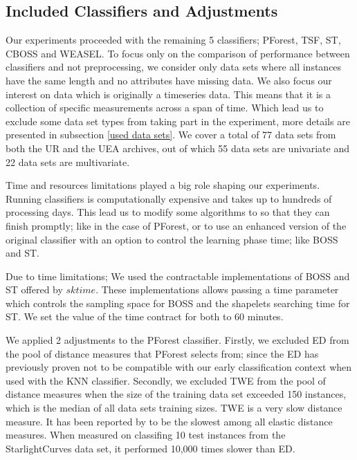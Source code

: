\subsection{Included Classifiers and Adjustments}
\label{SubsectionIncludedClassifiers}
Our experiments proceeded with the remaining 5 classifiers; PForest, TSF, ST, CBOSS and WEASEL.
To focus only on the comparison of performance between classifiers and not preprocessing, we consider only data sets where all instances have the same length and no attributes have missing data.
We also focus our interest on data which is originally a timeseries data. This means that it is a collection of specific measurements across a span of time.
Which lead us to exclude some data set types from taking part in the experiment, more details are presented in subsection \ref{used data sets}.
We cover a total of 77 data sets from both the UR and the UEA archives, out of which 55 data sets are univariate and 22 data sets are multivariate.

Time and resources limitations played a big role shaping our experiments. Running classifiers is computationally expensive \cite{schafer2020teaser}
and takes up to hundreds of processing days.
This lead us to modify some algorithms to so that they can finish promptly; like in the case of PForest, or to use an enhanced version of the original
classifier with an option to control the learning phase time; like BOSS and ST.

Due to time limitations; We used the contractable implementations of BOSS and ST offered by $sktime$.
These implementations allows passing a time parameter which controls the sampling space for BOSS and the shapelets searching time for ST.
We set the value of the time contract for both to 60 minutes.

We applied 2 adjustments to the PForest classifier.
Firstly, we excluded ED from the pool of distance measures that PForest selects from; since the ED has previously proven not to be compatible with our early classification context when used with the KNN classifier.
Secondly, we excluded TWE from the pool of distance measures when the size of the training data set exceeded 150 instances, which is the median of all data sets training sizes.
TWE is a very slow distance measure. It has been reported by \cite{bagnall2017great} to be the slowest among all elastic distance measures. When measured on classifing 10 test instances from the
StarlightCurves data set, it performed 10,000 times slower than ED.
